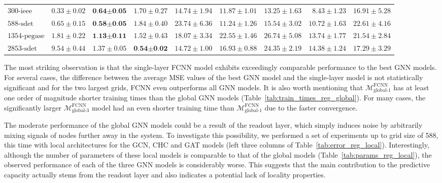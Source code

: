 \documentclass[journal]{IEEEtran}
\begin{document}
\begin{table*}[!ht]
{\begin{tabular}{lr|rrrrrrr}
    $\textrm{300-ieee}$ & $0.33 \pm 0.02$ & $\textbf{0.64} \boldsymbol{\pm} \textbf{0.05}$ & $1.70 \pm 0.27$ & $14.74 \pm 1.94$ & $11.87 \pm 1.01$ & $13.25 \pm 1.63$ & $8.43 \pm 1.23$ & $16.91 \pm 5.28$ \\
    $\textrm{588-sdet}$ & $0.65 \pm 0.15$ & $\textbf{0.58} \boldsymbol{\pm} \textbf{0.05}$ & $1.84 \pm 0.40$ & $23.74 \pm 6.36$ & $11.24 \pm 1.26$ & $15.54 \pm 3.02$ & $10.72 \pm 1.63$ & $22.61 \pm 4.16$ \\
    $\textrm{1354-pegase}$ & $1.81 \pm 0.22$ & $\textbf{1.13} \boldsymbol{\pm} \textbf{0.11}$ & $1.52 \pm 0.43$ & $18.07 \pm 3.34$ & $22.55 \pm 1.46$ & $26.74 \pm 5.08$ & $13.74 \pm 1.77$ & $21.54 \pm 2.84$ \\
    $\textrm{2853-sdet}$ & $9.54 \pm 0.44$ & $1.37 \pm 0.05$ & $\textbf{0.54} \boldsymbol{\pm} \textbf{0.02}$ & $14.72 \pm 1.00$ & $16.93 \pm 0.88$ & $24.35 \pm 2.19$ & $14.38 \pm 1.24$ & $17.29 \pm 3.29$ \\
    \bottomrule
    \end{tabular}
    }
\end{table*}


The most striking observation is that the single-layer FCNN model exhibits exceedingly comparable performance to the best GNN models.
For several cases, the difference between the average MSE values of the best GNN model and the single-layer model is not statistically significant and for the two largest grids, FCNN even outperforms all GNN models.
It is also worth mentioning that $\mathcal{M}^{\textrm{FCNN}}_{\textrm{global-1}}$ has at least one order of magnitude shorter training times than the global GNN models (Table~\ref{tab:train_times_reg_global}).
For many cases, the significantly larger $\mathcal{M}^{\textrm{FCNN}}_{\textrm{global-3}}$ model had an even shorter training time than $\mathcal{M}^{\textrm{FCNN}}_{\textrm{global-1}}$ due to the faster convergence.

The moderate performance of the global GNN models could be a result of the readout layer, which simply induces noise by arbitrarily mixing signals of nodes further away in the system. 
To investigate this possibility, we performed a set of experiments up to grid size of 588, this time with local architectures for the GCN, CHC and GAT models (left three columns of Table~\ref{tab:error_reg_local}). Interestingly, although the number of parameters of these local models is comparable to that of the global models (Table~\ref{tab:params_reg_local}), the observed performance of each of the three GNN models is considerably worse.
This suggests that the main contribution to the predictive capacity actually stems from the readout layer and also indicates a potential lack of locality properties.
\end{document}

